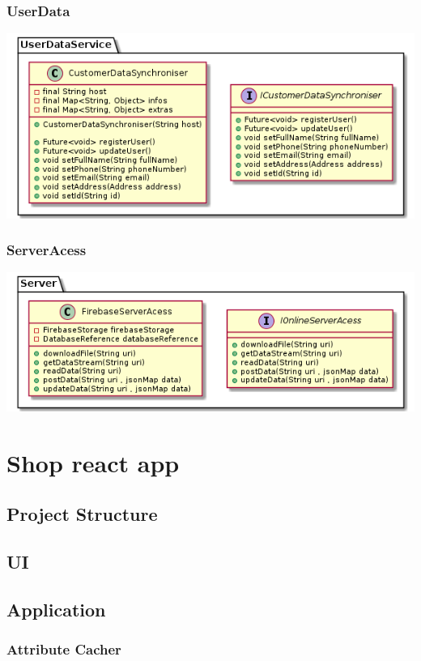 \documentclass{article}
\begin{document}
 
\subsubsection{UserData}
\includegraphics[scale=0.5]{./out/MobileApp/Infrastructure/UserData/UserData.png}\\


\subsubsection{ServerAcess}
\includegraphics[scale=0.5]{./out/MobileApp/Infrastructure/ServerAcess/ServerAccess.png}\\

\section{Shop react app}
\subsection{Project Structure}
\subsection{UI}

\subsection{Application}
\subsubsection{Attribute Cacher}
\end{document}
